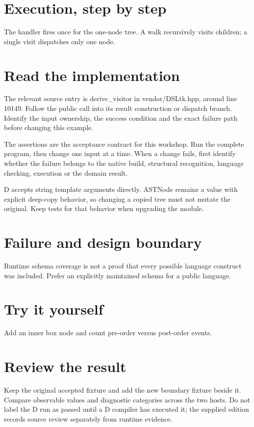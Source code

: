 
\section*{Execution, step by step}
The handler fires once for the one-node tree. A walk recursively visits children; a single visit dispatches only one node.

\section*{Read the implementation}
The relevant source entry is derive\_visitor in vendor/DSLtk.hpp, around line 10149. Follow the public call into its result construction or dispatch branch. Identify the input ownership, the success condition and the exact failure path before changing this example.

The assertions are the acceptance contract for this workshop. Run the complete program, then change one input at a time. When a change fails, first identify whether the failure belongs to the native build, structural recognition, language checking, execution or the domain result.

\clearpage
{}
D accepts string template arguments directly. ASTNode remains a value with explicit deep-copy behavior, so changing a copied tree must not mutate the original. Keep tests for that behavior when upgrading the module.


\section*{Failure and design boundary}
Runtime schema coverage is not a proof that every possible language construct was included. Prefer an explicitly maintained schema for a public language.

\section*{Try it yourself}
Add an inner box node and count pre-order versus post-order events.

\section*{Review the result}
Keep the original accepted fixture and add the new boundary fixture beside it. Compare observable values and diagnostic categories across the two hosts. Do not label the D run as passed until a D compiler has executed it; the supplied edition records source review separately from runtime evidence.


